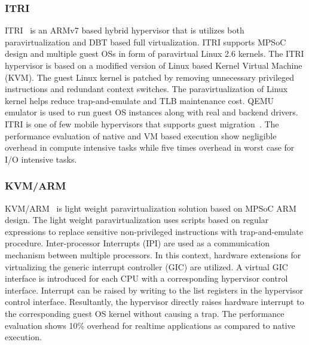 \documentclass[journal, 10pt]{IEEEtran}
\begin{document}
\subsubsection{ITRI}\label{sec:itri} 
ITRI~\cite{Smirnov2013} is an ARMv7 based hybrid hypervisor that is utilizes both paravirtualization and DBT based full virtualization. ITRI supports MPSoC design and multiple guest OSs in form of paravirtual Linux 2.6 kernels. The ITRI hypervisor is based on a modified version of Linux based Kernel Virtual Machine (KVM). The guest Linux kernel is patched by removing unnecessary privileged instructions and redundant context switches. The paravirtualization of Linux kernel helps reduce trap-and-emulate and TLB maintenance cost. QEMU emulator is used to run guest OS instances along with real and backend drivers. ITRI is one of few mobile hypervisors that supports guest migration~\cite{Groesbrink2014}. The performance evaluation of native and VM based execution show negligible overhead in compute intensive tasks while five times overhead in worst case for I/O intensive tasks.

\subsubsection{KVM/ARM}\label{sec:kvm} 
KVM/ARM~\cite{Dall2014} is light weight paravirtualization solution based on MPSoC ARM design. The light weight paravirtualization uses scripts based on regular expressions to replace sensitive non-privileged instructions with trap-and-emulate procedure. Inter-processor Interrupts (IPI) are used as a communication mechanism between multiple processors. In this context, hardware extensions for virtualizing the generic interrupt controller (GIC) are utilized. A virtual GIC interface is introduced for each CPU with a corresponding hypervisor control interface. Interrupt can be raised by writing to the list registers in the hypervisor control interface. Resultantly, the hypervisor directly raises hardware interrupt to the corresponding guest OS kernel without causing a trap. The performance evaluation shows 10\% overhead for realtime applications as compared to native execution.
\end{document}
